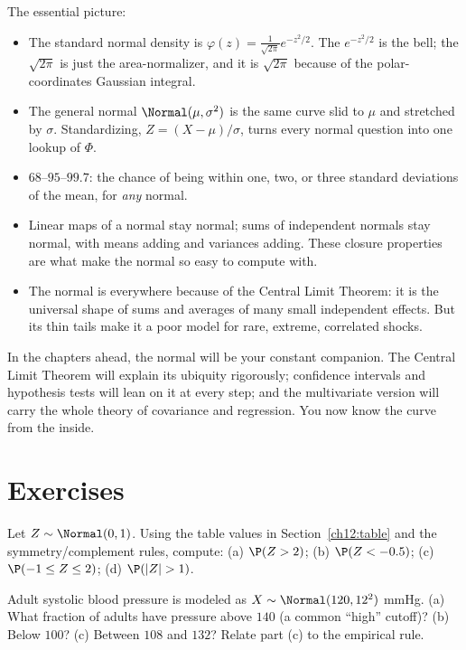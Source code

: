 \begin{recoverybox}
The essential picture:
\begin{itemize}
  \item The standard normal density is $\varphi(z) = \frac{1}{\sqrt{2\pi}}e^{-z^2/2}$.
  The $e^{-z^2/2}$ is the bell; the $\sqrt{2\pi}$ is just the area-normalizer, and
  it is $\sqrt{2\pi}$ because of the polar-coordinates Gaussian integral.
  \item The general normal $\Normal(\mu,\sigma^2)$ is the same curve slid to $\mu$
  and stretched by $\sigma$. Standardizing, $Z = (X-\mu)/\sigma$, turns every
  normal question into one lookup of $\Phi$.
  \item $68$--$95$--$99.7$: the chance of being within one, two, or three standard
  deviations of the mean, for \emph{any} normal.
  \item Linear maps of a normal stay normal; sums of independent normals stay
  normal, with means adding and variances adding. These closure properties are
  what make the normal so easy to compute with.
  \item The normal is everywhere because of the Central Limit Theorem: it is the
  universal shape of sums and averages of many small independent effects. But its
  thin tails make it a poor model for rare, extreme, correlated shocks.
\end{itemize}
\end{recoverybox}

In the chapters ahead, the normal will be your constant companion. The Central
Limit Theorem will explain its ubiquity rigorously; confidence intervals and
hypothesis tests will lean on it at every step; and the multivariate version will
carry the whole theory of covariance and regression. You now know the curve from
the inside.

\section*{Exercises}

\begin{exercise}
\label{ch12:exr-read}
Let $Z \sim \Normal(0,1)$. Using the table values in Section~\ref{ch12:table} and
the symmetry/complement rules, compute:
(a) $\P(Z > 2)$; (b) $\P(Z < -0.5)$; (c) $\P(-1 \le Z \le 2)$;
(d) $\P(|Z| > 1)$.
\end{exercise}

\begin{exercise}[Standardizing]
\label{ch12:exr-standardize}
Adult systolic blood pressure is modeled as $X \sim \Normal(120, 12^2)$ mmHg.
(a) What fraction of adults have pressure above $140$ (a common ``high'' cutoff)?
(b) Below $100$? (c) Between $108$ and $132$? Relate part (c) to the empirical
rule.
\end{exercise}

